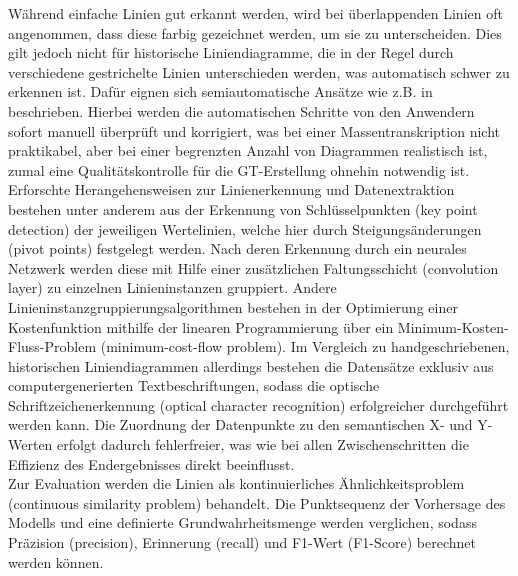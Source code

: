Während einfache Linien gut erkannt werden, wird bei überlappenden Linien oft angenommen, dass diese farbig gezeichnet werden, um sie zu unterscheiden. Dies gilt jedoch nicht für historische Liniendiagramme, die in der Regel durch verschiedene gestrichelte Linien unterschieden werden, was automatisch schwer zu erkennen ist. Dafür eignen sich semiautomatische Ansätze wie z.B. in \cite{inproceedings} beschrieben. Hierbei werden die automatischen Schritte von den Anwendern sofort manuell überprüft und korrigiert, was bei einer Massentranskription nicht praktikabel, aber bei einer begrenzten Anzahl von Diagrammen realistisch ist, zumal eine Qualitätskontrolle für die GT-Erstellung ohnehin notwendig ist.
\\
Erforschte Herangehensweisen \cite{9423395} zur Linienerkennung und Datenextraktion bestehen unter anderem aus der Erkennung von Schlüsselpunkten (key point detection) der jeweiligen Wertelinien, welche hier durch Steigungsänderungen (pivot points) festgelegt werden. Nach deren Erkennung durch ein neurales Netzwerk werden diese mit Hilfe einer zusätzlichen Faltungsschicht (convolution layer) zu einzelnen Linieninstanzen gruppiert. Andere Linieninstanzgruppierungsalgorithmen \cite{parsingimages} bestehen in der Optimierung einer Kostenfunktion mithilfe der linearen Programmierung über ein Minimum-Kosten-Fluss-Problem (minimum-cost-flow problem). Im Vergleich zu handgeschriebenen, historischen Liniendiagrammen allerdings bestehen die Datensätze exklusiv aus computergenerierten Textbeschriftungen, sodass die optische Schriftzeichenerkennung (optical character recognition) erfolgreicher durchgeführt werden kann. Die Zuordnung der Datenpunkte zu den semantischen X- und Y-Werten erfolgt dadurch fehlerfreier, was wie bei allen Zwischenschritten die Effizienz des Endergebnisses direkt beeinflusst.
\\
Zur Evaluation werden die Linien als kontinuierliches Ähnlichkeitsproblem (continuous similarity problem) behandelt. Die Punktsequenz der Vorhersage des Modells und eine definierte Grundwahrheitsmenge werden verglichen, sodass Präzision (precision), Erinnerung (recall) und F1-Wert (F1-Score) berechnet werden können.